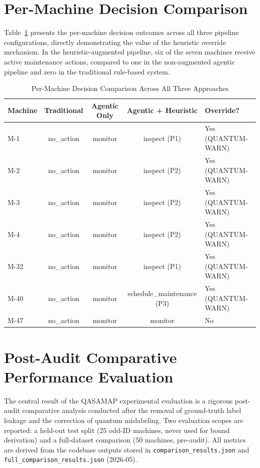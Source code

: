\section{Per-Machine Decision Comparison}

Table~\ref{tab:per_machine_comparison} presents the per-machine decision outcomes across all three pipeline configurations, directly demonstrating the value of the heuristic override mechanism. In the heuristic-augmented pipeline, six of the seven machines receive active maintenance actions, compared to one in the non-augmented agentic pipeline and zero in the traditional rule-based system.

\begin{table}[htbp]
\centering
\caption{Per-Machine Decision Comparison Across All Three Approaches}
\label{tab:per_machine_comparison}
\begin{tabular}{lcccl}
\hline
\textbf{Machine} & \textbf{Traditional} & \textbf{Agentic Only} & \textbf{Agentic + Heuristic} & \textbf{Override?} \\
\hline
M-1  & no\_action & monitor & inspect (P1)              & Yes (QUANTUM-WARN) \\
M-2  & no\_action & monitor & inspect (P2)              & Yes (QUANTUM-WARN) \\
M-3  & no\_action & monitor & inspect (P2)              & Yes (QUANTUM-WARN) \\
M-4  & no\_action & monitor & inspect (P2)              & Yes (QUANTUM-WARN) \\
M-32 & no\_action & monitor & inspect (P1)              & Yes (QUANTUM-WARN) \\
M-40 & no\_action & monitor & schedule\_maintenance (P3) & Yes (QUANTUM-WARN) \\
M-47 & no\_action & monitor & monitor                   & No \\
\hline
\end{tabular}
\end{table}

\section{Post-Audit Comparative Performance Evaluation}

The central result of the QASAMAP experimental evaluation is a rigorous post-audit comparative analysis conducted after the removal of ground-truth label leakage and the correction of quantum mislabeling. Two evaluation scopes are reported: a held-out test split (25 odd-ID machines, never used for bound derivation) and a full-dataset comparison (50 machines, pre-audit). All metrics are derived from the codebase outputs stored in \texttt{comparison\_results.json} and \texttt{full\_comparison\_results.json} (2026-05).

